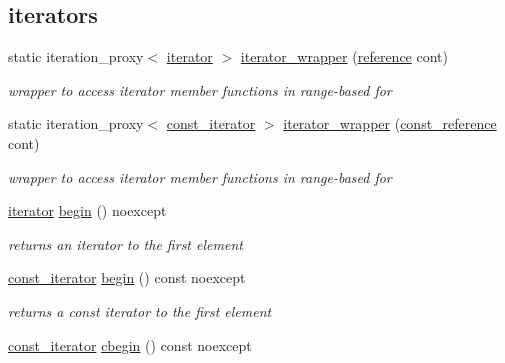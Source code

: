 \subsection*{iterators}
\begin{DoxyCompactItemize}
\item 
static iteration\+\_\+proxy$<$ \mbox{\hyperlink{classnlohmann_1_1basic__json_a099316232c76c034030a38faa6e34dca}{iterator}} $>$ \mbox{\hyperlink{classnlohmann_1_1basic__json_aea8c06bb8e632f14cd77632519213d75}{iterator\+\_\+wrapper}} (\mbox{\hyperlink{classnlohmann_1_1basic__json_ac6a5eddd156c776ac75ff54cfe54a5bc}{reference}} cont)
\begin{DoxyCompactList}\small\item\em wrapper to access iterator member functions in range-\/based for \end{DoxyCompactList}\item 
static iteration\+\_\+proxy$<$ \mbox{\hyperlink{classnlohmann_1_1basic__json_a41a70cf9993951836d129bb1c2b3126a}{const\+\_\+iterator}} $>$ \mbox{\hyperlink{classnlohmann_1_1basic__json_adb4db7abbc5ba12c9273f032a7b89198}{iterator\+\_\+wrapper}} (\mbox{\hyperlink{classnlohmann_1_1basic__json_a4057c5425f4faacfe39a8046871786ca}{const\+\_\+reference}} cont)
\begin{DoxyCompactList}\small\item\em wrapper to access iterator member functions in range-\/based for \end{DoxyCompactList}\item 
\mbox{\hyperlink{classnlohmann_1_1basic__json_a099316232c76c034030a38faa6e34dca}{iterator}} \mbox{\hyperlink{classnlohmann_1_1basic__json_a0ff28dac23f2bdecee9564d07f51dcdc}{begin}} () noexcept
\begin{DoxyCompactList}\small\item\em returns an iterator to the first element \end{DoxyCompactList}\item 
\mbox{\hyperlink{classnlohmann_1_1basic__json_a41a70cf9993951836d129bb1c2b3126a}{const\+\_\+iterator}} \mbox{\hyperlink{classnlohmann_1_1basic__json_a4f0f5dd42b2987ff20306ed78bd31d1d}{begin}} () const noexcept
\begin{DoxyCompactList}\small\item\em returns a const iterator to the first element \end{DoxyCompactList}\item 
\mbox{\hyperlink{classnlohmann_1_1basic__json_a41a70cf9993951836d129bb1c2b3126a}{const\+\_\+iterator}} \mbox{\hyperlink{classnlohmann_1_1basic__json_ad865d6c291b237ae508d5cb2146b5877}{cbegin}} () const noexcept

\end{DoxyCompactItemize}
